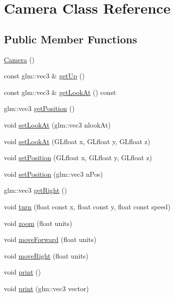 \hypertarget{class_camera}{\section{Camera Class Reference}
\label{class_camera}
}
\subsection*{Public Member Functions}
\begin{DoxyCompactItemize}
\item 
\hyperlink{class_camera_a01f94c3543f56ede7af49dc778f19331}{Camera} ()
\item 
const glm\+::vec3 \& \hyperlink{class_camera_ae8c98a3a6a0982ec499dd89b513c4d3b}{get\+Up} ()
\item 
const glm\+::vec3 \& \hyperlink{class_camera_a3807fbe378ecf9ef69a239c8c6505d7f}{get\+Look\+At} () const 
\item 
glm\+::vec3 \hyperlink{class_camera_a520c5a7413b3e704f2f442288db17bcf}{get\+Position} ()
\item 
void \hyperlink{class_camera_a0187c2a311d93ba8ce1e02c5fd3e54b9}{set\+Look\+At} (glm\+::vec3 nlook\+At)
\item 
void \hyperlink{class_camera_ad338c906689cf9a76265b430964ad01b}{set\+Look\+At} (G\+Lfloat x, G\+Lfloat y, G\+Lfloat z)
\item 
void \hyperlink{class_camera_ad50e54273e56bcd1b9961a143798e520}{set\+Position} (G\+Lfloat x, G\+Lfloat y, G\+Lfloat z)
\item 
void \hyperlink{class_camera_a0c9508b01564cd2940c8b1602ec740c2}{set\+Position} (glm\+::vec3 n\+Pos)
\item 
glm\+::vec3 \hyperlink{class_camera_a21c35c617f5795382a7553bcbadee849}{get\+Right} ()
\item 
void \hyperlink{class_camera_acbd67406f38a0c8a5563151be5c4452f}{turn} (float const x, float const y, float const speed)
\item 
void \hyperlink{class_camera_acb243a876adfba52a1ee38cc5d3eab06}{zoom} (float units)
\item 
void \hyperlink{class_camera_a8b85f016a8f8d92764f982de9d143e20}{move\+Forward} (float units)
\item 
void \hyperlink{class_camera_a00221bfd83b4744ba6b91643110a087d}{move\+Right} (float units)
\item 
void \hyperlink{class_camera_a905d2a0f8677aaad1ee17eb2a842efe5}{print} ()
\item 
void \hyperlink{class_camera_a8a6255dc5113689c609f83b76495d6dd}{print} (glm\+::vec3 vector)
\end{DoxyCompactItemize}



